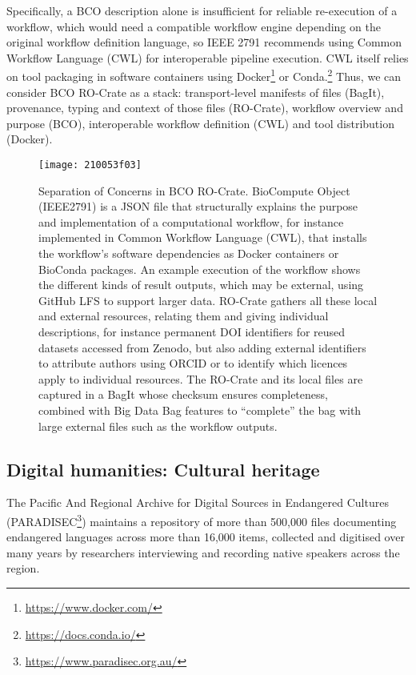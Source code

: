 \documentclass[ds,v1.1.2,openaccess]{iosart2x}%
\begin{document}
Specifically, a BCO description alone is insufficient for reliable
re-execution of a workflow, which would need a compatible workflow
engine depending on the original workflow definition language, so IEEE
2791 recommends using Common Workflow Language (CWL)
\cite{doi:10.1145/3486897} for interoperable pipeline execution. CWL itself
relies on tool packaging in software containers using
Docker\footnote{\url{https://www.docker.com/}} or Conda.\footnote{\url{https://docs.conda.io/}}
Thus, we can consider BCO RO-Crate as a stack: transport-level
manifests of files (BagIt), provenance, typing and context of those
files (RO-Crate), workflow overview and purpose (BCO), interoperable
workflow definition (CWL) and tool distribution (Docker).

%
\begin{figure}%
\texttt{[image: 210053f03]}
\caption{Separation of Concerns in BCO RO-Crate. BioCompute
Object (IEEE2791) is a JSON file that structurally explains the purpose
and implementation of a computational workflow, for instance
implemented in Common Workflow Language (CWL), that installs the
workflow's software dependencies as Docker containers or BioConda
packages. An example execution of the workflow shows the different
kinds of result outputs, which may be external, using GitHub LFS \cite
{github-lfs} to support larger data. RO-Crate gathers all these local
and external resources, relating them and giving individual
descriptions, for instance permanent DOI identifiers for reused
datasets accessed from Zenodo, but also adding external identifiers to
attribute authors using ORCID or to identify which licences apply to
individual resources. The RO-Crate and its local files are captured in
a BagIt whose checksum ensures completeness, combined with Big Data Bag
\cite{doi:10.1109/BigData.2016.7840618} features to ``complete'' the
bag with large external files such as the workflow outputs.}
\label{fig:sep_concerns}
\end{figure}
%
\subsection{Digital humanities: Cultural heritage}%

\label{sec:culturalheritage}

The Pacific And Regional Archive for Digital Sources in Endangered
Cultures (PARADISEC\footnote{\url{https://www.paradisec.org.au/}}) \cite{doi:10125/4567}
maintains a repository of more than 500,000 files documenting
endangered languages across more than 16,000 items, collected and
digitised over many years by researchers interviewing and recording
native speakers across the region.
\end{document}
